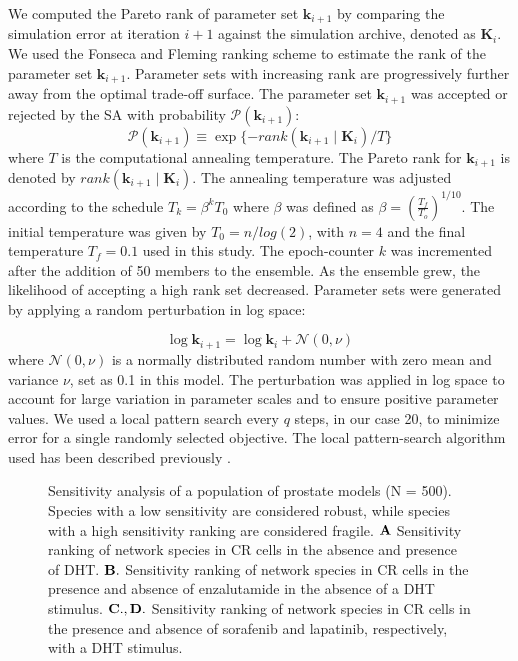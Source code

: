 \documentclass[12pt]{article}
\begin{document}
We computed the Pareto rank of parameter set $\mathbf{k}_{i+1}$ by comparing the simulation error at iteration $i+1$ against the simulation archive, denoted as $\mathbf{K}_i$. We used the Fonseca and Fleming ranking scheme \cite{Fonseca1993} to estimate the rank of the parameter set $\mathbf{k}_{i+1}$. Parameter sets with increasing rank are progressively further away from the optimal trade-off surface. The parameter set $\mathbf{k}_{i+1}$ was accepted or rejected by the SA with probability $\mathcal{P}\left(\mathbf{k}_{i+1}\right)$: 
\begin{equation}\label{eqn_costMOSA}
\mathcal{P}(\mathbf{k}_{i+1}) \equiv \exp{\{-rank\left(\mathbf{k}_{i+1} \mid \mathbf{K}_{i} \right)/T\}}
\end{equation}
where $T$ is the computational annealing temperature. The Pareto rank for $\mathbf{k}_{i+1}$ is denoted by $rank\left(\mathbf{k}_{i+1}\mid \mathbf{K}_{i}\right)$. The annealing temperature was  adjusted according to the schedule
$T_k = \beta^k T_0$
where $\beta$ was defined as $\beta = \left(\frac{T_{f}}{T_{o}}\right)^{1/10}$. The initial temperature was given by $T_0 = n/log(2)$, with $n=4$ and the final temperature $T_f = 0.1$ used in this study.
The epoch-counter $k$ was incremented after the addition of 50 members to the ensemble. As the ensemble grew, the likelihood of accepting a high rank set decreased. Parameter sets were generated by applying a random perturbation in log space: 

\begin{equation}
\log\mathbf{k}_{i+1} = \log\mathbf{k}_i + \mathcal{N}(0,\nu)
\end{equation}
where $\mathcal{N}(0,\nu)$ is a normally distributed random number with zero mean and variance $\nu$, set as 0.1 in this model. The perturbation was applied in log space to account for large variation in parameter scales and to ensure positive parameter values. We used a local pattern search every $q$ steps, in our case 20, to minimize error for a single randomly selected objective. The local pattern-search algorithm used has been described previously \cite{Gadkar2003}.


\clearpage


\clearpage

\begin{figure}\centering
\caption{Sensitivity analysis of a population of prostate models (N = 500). Species with a low sensitivity are considered robust, while species with a high sensitivity ranking are considered fragile. $\bf{A}$ Sensitivity ranking of network species in CR cells in the absence and presence of DHT. $\bf{B.}$ Sensitivity ranking of network species in CR cells in the presence and absence of enzalutamide in the absence of a DHT stimulus. $\bf{C.,D.}$ Sensitivity ranking of network species in CR cells in the presence and absence of sorafenib and lapatinib, respectively, with a DHT stimulus.}
\label{fg:Supp_Sensitivity}
\end{figure}
\end{document}

